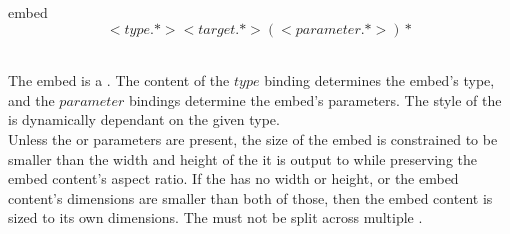 \begin{identifier}{embed}
\[<type .*> <target .*>( <parameter .*>)*\]
\end{identifier}
 \\

The embed is a . The content of the \inline$type$ binding determines the embed's type, and the \inline$parameter$ bindings determine the embed's parameters. The style of the  is dynamically dependant on the given type. \\

Unless the  or  parameters are present, the size of the embed  is constrained to be smaller than the width and height of the  it is output to while preserving the embed content's aspect ratio. If the  has no width or height, or the embed content's dimensions are smaller than both of those, then the embed content is sized to its own dimensions. The  must not be split across multiple .\\





